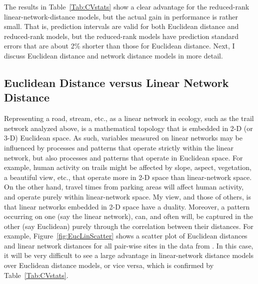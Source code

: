 \documentclass[11pt, titlepage]{article}\usepackage[]{graphicx}\usepackage[]{color}
\begin{document}
\begin{spacing}{1.9}
\begin{flushleft}
The results in Table~\ref{Tab:CVstats} show a clear advantage for the reduced-rank linear-network-distance models, but the actual gain in performance is rather small.  That is, prediction intervals are valid for both Euclidean distance and reduced-rank models, but the reduced-rank models have prediction standard errors that are about 2\% shorter than those for Euclidean distance. Next, I discuss Euclidean distance and network distance models in more detail.

\subsection*{Euclidean Distance versus Linear Network Distance}




Representing a road, stream, etc., as a linear network in ecology, such as the trail network analyzed above, is a mathematical topology that is embedded in 2-D (or 3-D) Euclidean space.  As such, variables measured on linear networks may be influenced by processes and patterns that operate strictly within the linear network, but also processes and patterns that operate in Euclidean space. For example, human activity on trails might be affected by slope, aspect, vegetation, a beautiful view, etc., that operate more in 2-D space than linear-network space.  On the other hand, travel times from parking areas will affect human activity, and operate purely within linear-network space. My view, and those of others, \citep{Dale:Fort:from:2010,Pete:Ver:Isaa:stre:2013} is that linear networks embedded in 2-D space have a duality.  Moreover, a pattern occurring on one (say the linear network), can, and often will, be captured in the other (say Euclidean) purely through the correlation between their distances.  For example, Figure~\ref{fig:EucLinScatter} shows a scatter plot of Euclidean distances and linear network distances for all pair-wise sites in the data from \citet{Ladl:Avga:Whea:Boyc:pred:2016}.  In this case, it will be very difficult to see a large advantage in linear-network distance models over Euclidean distance models, or vice versa, which is confirmed by Table~\ref{Tab:CVstats}.


\end{flushleft}
\end{spacing}
\end{document}
